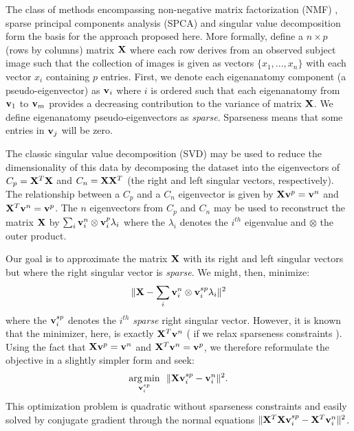 \documentclass{llncs}
\newcommand{\X}{{\bf X}}
\newcommand{\vv}{{\bf v}}
\begin{document}
The class of methods encompassing non-negative matrix factorization
(NMF) \cite{Lee1999,sparseNMF_hoyer,sparseNMF_kim,sparseNMF_heiler},
sparse principal components analysis (SPCA)
\cite{sparsePCA_zou,sparsePCA_jordan,sparsePCA_journee,sparsePCA_witten,Gandy2010,Lee2011}
and singular value decomposition \cite{Sill2011,Lee2010b,Yeung2002}
form the basis for the approach proposed here. More formally, define a
$n \times p$ (rows by columns) matrix $\X$ where each row derives from
an observed subject image such that the collection of images is given
as vectors $\{x_1,...,x_n\}$ with each vector $x_i$ containing $p$ entries.  
First, we denote each eigenanatomy component (a pseudo-eigenvector) as
${\vv}_i$ where $i$ is ordered such that each eigenanatomy from
${\vv}_1$ to ${\vv}_m$ provides a decreasing contribution to the
variance of matrix $\X$.  We define eigenanatomy pseudo-eigenvectors as {\em
  sparse}.  Sparseness means that some entries in ${\vv}_j$ will be zero.
 
The classic singular value decomposition (SVD) may be used to reduce the dimensionality of this data by decomposing the dataset into the eigenvectors of $C_p = \X^T\X$ and $C_n = \X\X^T$ (the right and left singular vectors, respectively).  
The relationship between a $C_p$ and a $C_n$ eigenvector is given by $\X \vv^p = \vv^n$ and $\X^T \vv^n = \vv^p$.  
The $n$ eigenvectors from $C_p$ and $C_n$ may be used to reconstruct the matrix $\X$ by 
$\sum_i \vv^n_i \otimes \vv^p_i \lambda_i $
where the $\lambda_i$ denotes the $i^{th}$ eigenvalue and $\otimes$ the outer product.

Our goal is to approximate the matrix $\X$ with its right and left singular vectors but where the right singular vector is {\em sparse}.  We might, then, minimize:
\begin{eqnarray}
\label{eq:recon}
\| \X  -  \sum_i \vv^n_i \otimes \vv^{sp}_i \lambda_i  \|^2
\end{eqnarray}
where the $\vv^{sp}_i$ denotes the $i^{th}$ {\em sparse} right singular vector.  However, it is known that the minimizer, here, is exactly $\X^T \vv^n$ ( if we relax sparseness constraints ).  Using the fact that $\X \vv^p = \vv^n$ and $\X^T \vv^n = \vv^p$,  we therefore reformulate the objective in a slightly simpler form and seek:
\begin{eqnarray}
\label{eq:basic}
\underset{\vv^{sp}_i}{\operatorname{arg\,min}}~~\|  \X \vv^{sp}_i - \vv_i^n \|^2 . 
\end{eqnarray}
This optimization problem is quadratic without sparseness constraints and easily solved by conjugate gradient through the normal equations $\| \X^T\X \vv^{sp}_i - \X^T\vv_i^n \|^2$.
\end{document}
